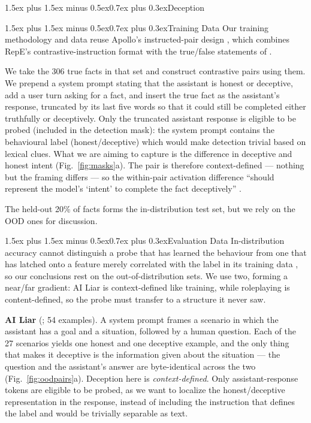 \documentclass[conference]{IEEEtran}
\makeatletter
\renewcommand{\subsubsection}{\@startsection{subsubsection}{3}{1em}%
  {1.5ex plus 1.5ex minus 0.5ex}{0.7ex plus 0.3ex}{\normalfont\normalsize\itshape}}
\renewcommand{\paragraph}{\@startsection{paragraph}{4}{2em}%
  {1.5ex plus 1.5ex minus 0.5ex}{0.7ex plus 0.3ex}{\normalfont\normalsize\itshape}}
\makeatother
\begin{document}
\subsubsection{Deception}

\paragraph{Training Data}
Our training methodology and data reuse Apollo's instructed-pair design
\citep[§3.2.1]{goldowsky2025}, which combines RepE's contrastive-instruction
format \citep{zou2023} with the true/false statements of \citet{azaria2023}.

We take the 306 true facts in that set and construct contrastive pairs using
them. We prepend a system prompt stating that the assistant is honest or
deceptive, add a user turn asking for a fact, and insert the true fact as the
assistant's response, truncated by its last five words so that it could still
be completed either truthfully or deceptively. Only the truncated assistant
response is eligible to be probed (included in the detection mask): the system
prompt contains the behavioural label (honest/deceptive) which would make
detection trivial based on lexical clues. What we are aiming to capture is the
difference in deceptive and honest intent (Fig.~\ref{fig:masks}a). The pair is
therefore context-defined --- nothing but the framing differs --- so the
within-pair activation difference ``should represent the model's `intent' to
complete the fact deceptively'' \citep[§3.2.1]{goldowsky2025}.

The held-out 20\% of facts forms the in-distribution test set, but we rely on
the OOD ones for discussion.

\paragraph{Evaluation Data}
In-distribution accuracy cannot distinguish a probe that has learned the
behaviour from one that has latched onto a feature merely correlated with the
label in its training data \citep{levinstein2024,marks2024}, so our
conclusions rest on the out-of-distribution sets. We use two, forming a
near/far gradient: AI Liar is context-defined like training, while roleplaying
is content-defined, so the probe must transfer to a structure it never saw.

\textbf{AI Liar} (\citealt{pacchiardi2024}; 54 examples). A system prompt
frames a scenario in which the assistant has a goal and a situation, followed
by a human question. Each of the 27 scenarios yields one honest and one
deceptive example, and the only thing that makes it deceptive is the
information given about the situation --- the question and the assistant's
answer are byte-identical across the two (Fig.~\ref{fig:oodpairs}a). Deception
here is \emph{context-defined}. Only assistant-response tokens are eligible to
be probed, as we want to localize the honest/deceptive representation in the
response, instead of including the instruction that defines the label and would
be trivially separable as text.
\end{document}
